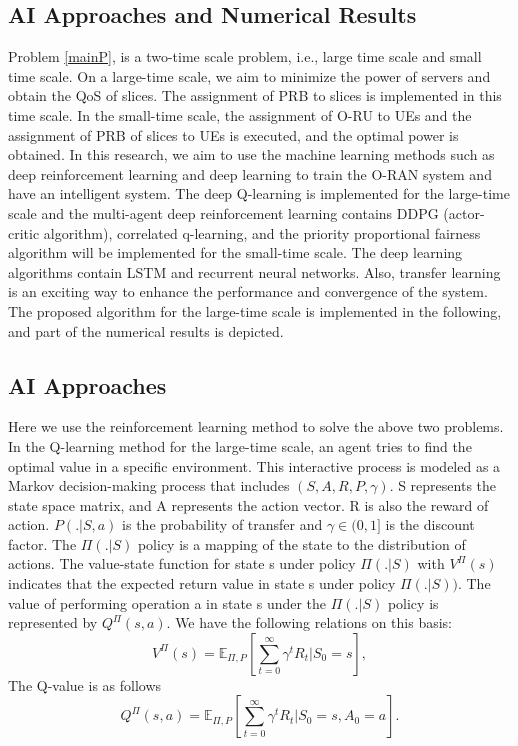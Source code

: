 \documentclass{article}
\begin{document}
\subsection{AI Approaches and Numerical Results}
Problem \eqref{mainP}, is a two-time scale problem, i.e., large time scale and small time scale. On a large-time scale, we aim to minimize the power of servers and obtain the QoS of slices. The assignment of PRB to slices is implemented in this time scale. In the small-time scale, the assignment of O-RU to UEs and the assignment of PRB of slices to UEs is executed, and the optimal power is obtained.
In this research, we aim to use the machine learning methods such as deep reinforcement learning and deep learning to train the O-RAN system and have an intelligent system.
The deep Q-learning is implemented for the large-time scale and 
 the multi-agent deep reinforcement learning contains DDPG (actor-critic algorithm), correlated q-learning, and the priority proportional fairness algorithm will be implemented for the small-time scale. 
The deep learning algorithms contain LSTM and recurrent neural networks. Also, transfer learning is an exciting way to enhance the performance and convergence of the system.
The proposed algorithm for the large-time scale is implemented in the following, and part of the numerical results is depicted.
\subsection{AI Approaches} \label{AIP}
Here we use the reinforcement learning method to solve the above two problems.
In the Q-learning method for the large-time scale, an agent tries to find the optimal value in a specific environment. This interactive process is modeled as a Markov decision-making process that includes $ (S, A, R, P, \gamma) $.
S represents the state space matrix, and A represents the action vector. R is also the reward of action. $ P (. | S, a) $ is the probability of transfer and $ \gamma \in (0,1] $ is the discount factor.  The $ \Pi (. | S) $ policy is a mapping of the state to the distribution of actions. The value-state function for state s under policy $ \Pi (. | S) $ with $ V^{\Pi} (s) $ indicates that the expected return value in state s under policy $ \Pi (. | S) ) $. The value of performing operation a in state s under the $ \Pi (. | S) $ policy is represented by $ Q ^ {\Pi} (s, a) $. We have the following relations on this basis:
\begin{equation}
	V^{\Pi}(s) = \mathbb{E}_{\Pi,P}[\sum_{t=0}^{\infty}\gamma^tR_t|S_0=s],
 \end{equation}
 The Q-value is as follows
 \begin{equation}
	Q^{\Pi}(s,a) = \mathbb{E}_{\Pi,P}[\sum_{t=0}^{\infty}\gamma^tR_t|S_0=s,A_0=a].
\end{equation}
 
\end{document}
